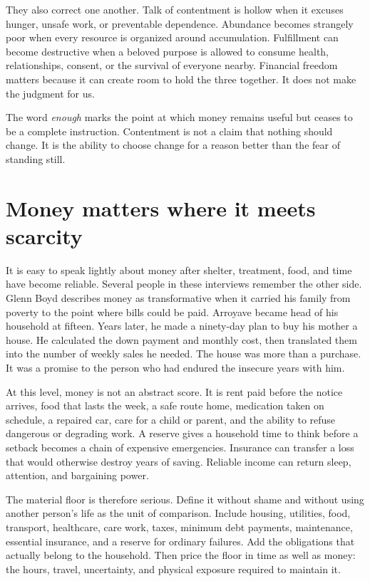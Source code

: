 They also correct one another. Talk of contentment is hollow when it excuses
hunger, unsafe work, or preventable dependence. Abundance becomes strangely
poor when every resource is organized around accumulation. Fulfillment can
become destructive when a beloved purpose is allowed to consume health,
relationships, consent, or the survival of everyone nearby. Financial freedom
matters because it can create room to hold the three together. It does not make
the judgment for us.

The word \emph{enough} marks the point at which money remains useful but ceases
to be a complete instruction. Contentment is not a claim that nothing should
change. It is the ability to choose change for a reason better than the fear of
standing still.

\section{Money matters where it meets scarcity}

It is easy to speak lightly about money after shelter, treatment, food, and
time have become reliable. Several people in these interviews remember the
other side. Glenn Boyd describes money as transformative when it carried his
family from poverty to the point where bills could be paid. Arroyave became
head of his household at fifteen. Years later, he made a ninety-day plan to
buy his mother a house. He calculated the down payment and monthly cost, then
translated them into the number of weekly sales he needed. The house was more
than a purchase. It was a promise to the person who had endured the insecure
years with him.

At this level, money is not an abstract score. It is rent paid before the
notice arrives, food that lasts the week, a safe route home, medication taken
on schedule, a repaired car, care for a child or parent, and the ability to
refuse dangerous or degrading work. A reserve gives a household time to think
before a setback becomes a chain of expensive emergencies. Insurance can
transfer a loss that would otherwise destroy years of saving. Reliable income
can return sleep, attention, and bargaining power.

The material floor is therefore serious. Define it without shame and without
using another person's life as the unit of comparison. Include housing,
utilities, food, transport, healthcare, care work, taxes, minimum debt
payments, maintenance, essential insurance, and a reserve for ordinary
failures. Add the obligations that actually belong to the household. Then
price the floor in time as well as money: the hours, travel, uncertainty, and
physical exposure required to maintain it.

